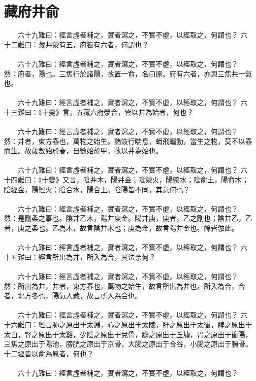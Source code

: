 \section{藏府井俞}

　　六十九難曰：經言虛者補之，實者瀉之，不實不虛，以經取之，何謂也？
六十二難曰：藏井滎有五，府獨有六者，何謂也？
\\\\
　　六十九難曰：經言虛者補之，實者瀉之，不實不虛，以經取之，何謂也？
然：府者，陽也。三焦行於諸陽，故置一俞，名曰原。府有六者，亦與三焦共一氣也。
\\\\
　　六十九難曰：經言虛者補之，實者瀉之，不實不虛，以經取之，何謂也？
六十三難曰：《十變》言，五藏六府滎合，皆以井為始者，何也？
\\\\
　　六十九難曰：經言虛者補之，實者瀉之，不實不虛，以經取之，何謂也？
然：井者，東方春也，萬物之始生。諸蚑行喘息，蜎飛蠕動，當生之物，莫不以春而生。故歲數始於春，日數始於甲，故以井為始也。
\\\\
　　六十九難曰：經言虛者補之，實者瀉之，不實不虛，以經取之，何謂也？
六十四難曰：《十變》又言，陰井木，陽井金；陰滎火，陽滎水；陰俞土，陽俞木；陰經金，陽經火；陰合水，陽合土。陰陽皆不同，其意何也？
\\\\
　　六十九難曰：經言虛者補之，實者瀉之，不實不虛，以經取之，何謂也？
然：是剛柔之事也。陰井乙木，陽井庚金。陽井庚，庚者，乙之剛也；陰井乙，乙者，庚之柔也。乙為木，故言陰井木也；庚為金，故言陽井金也。餘皆倣此。
\\\\
　　六十九難曰：經言虛者補之，實者瀉之，不實不虛，以經取之，何謂也？
六十五難曰：經言所出為井，所入為合，其法奈何？
\\\\
　　六十九難曰：經言虛者補之，實者瀉之，不實不虛，以經取之，何謂也？
然：所出為井，井者，東方春也，萬物之始生，故言所出為井也。所入為合，合者，北方冬也，陽氣入藏，故言所入為合也。
\\\\
　　六十九難曰：經言虛者補之，實者瀉之，不實不虛，以經取之，何謂也？
六十六難曰：經言肺之原出于太淵，心之原出于太陵，肝之原出于太衝，脾之原出于太白，腎之原出于太谿，少陰之原出于兌骨，膽之原出于丘墟，胃之原出于衝陽，三焦之原出于陽池，膀胱之原出于京骨，大腸之原出于合谷，小腸之原出于腕骨。十二經皆以俞為原者，何也？
\\\\
　　六十九難曰：經言虛者補之，實者瀉之，不實不虛，以經取之，何謂也？

